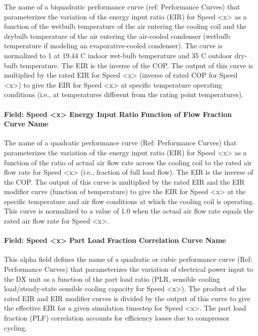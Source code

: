The name of a biquadratic performance curve (ref: Performance Curves) that parameterizes the variation of the energy input ratio (EIR) for Speed \textless{}x\textgreater{} as a function of the wetbulb temperature of the air entering the cooling coil and the drybulb temperature of the air entering the air-cooled condenser (wetbulb temperature if modeling an evaporative-cooled condenser). The curve is normalized to 1 at 19.44 C indoor wet-bulb temperature and 35 C outdoor dry-bulb temperature. The EIR is the inverse of the COP. The output of this curve is multiplied by the rated EIR for Speed \textless{}x\textgreater{} (inverse of rated COP for Speed \textless{}x\textgreater{}) to give the EIR for Speed \textless{}x\textgreater{} at specific temperature operating conditions (i.e., at temperatures different from the rating point temperatures).

\paragraph{Field: Speed \textless{}x\textgreater{} Energy Input Ratio Function of Flow Fraction Curve Name}\label{field-speed-x-energy-input-ratio-function-of-flow-fraction-curve-name}

The name of a quadratic performance curve (Ref: Performance Curves) that parameterizes the variation of the energy input ratio (EIR) for Speed \textless{}x\textgreater{} as a function of the ratio of actual air flow rate across the cooling coil to the rated air flow rate for Speed \textless{}x\textgreater{} (i.e., fraction of full load flow). The EIR is the inverse of the COP. The output of this curve is multiplied by the rated EIR and the EIR modifier curve (function of temperature) to give the EIR for Speed \textless{}x\textgreater{} at the specific temperature and air flow conditions at which the cooling coil is operating. This curve is normalized to a value of 1.0 when the actual air flow rate equals the rated air flow rate for Speed \textless{}x\textgreater{}.

\paragraph{Field: Speed \textless{}x\textgreater{} Part Load Fraction Correlation Curve Name}\label{field-speed-x-part-load-fraction-correlation-curve-name}

This alpha field defines the name of a quadratic or cubic performance curve (Ref: Performance Curves) that parameterizes the variation of electrical power input to the DX unit as a function of the part load ratio (PLR, sensible cooling load/steady-state sensible cooling capacity for Speed \textless{}x\textgreater{}). The product of the rated EIR and EIR modifier curves is divided by the output of this curve to give the effective EIR for a given simulation timestep for Speed \textless{}x\textgreater{}. The part load fraction (PLF) correlation accounts for efficiency losses due to compressor cycling.

